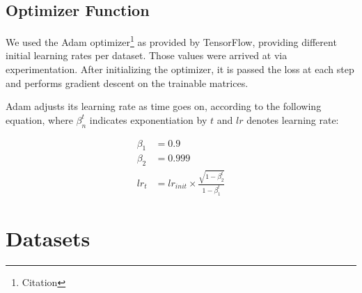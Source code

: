 \subsection{Optimizer Function}
We used the Adam optimizer\footnote{Citation} as provided by TensorFlow, 
providing different initial learning rates per dataset. Those values were 
arrived at via experimentation. After initializing the optimizer, it is passed 
the loss at each step and performs gradient descent on the trainable matrices.

Adam adjusts its learning rate as time goes on, according to the following 
equation, where $\beta_n^t$ indicates exponentiation by $t$ and $lr$ denotes 
learning rate:
\begin{figure}[h]
	\begin{minipage}{.25\textwidth}
		\centering
		\begin{align*}
			\nonumber
			\beta_1 &= 0.9\\
			\nonumber
			\beta_2 &= 0.999\\
			lr_t &= lr_{init} \times \frac{\sqrt{1-\beta_2^t}}{1-\beta_1^t}
		\end{align*}
	\end{minipage}
	\hfill
	\begin{minipage}{.6\textwidth}
		\centering
	\end{minipage}
\end{figure}

\section{Datasets}


